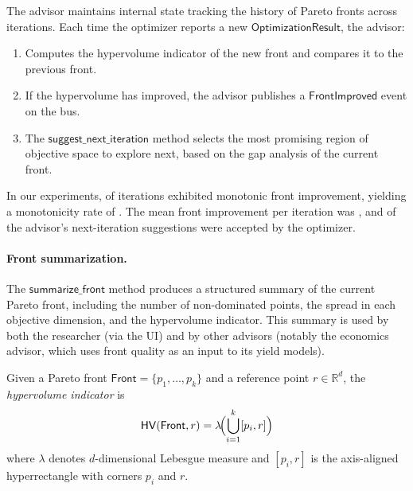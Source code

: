 \documentclass[11pt]{article}
\newcommand{\Front}{\mathsf{Front}}
\begin{document}
The advisor maintains internal state tracking the history of
Pareto fronts across iterations.  Each time the optimizer reports
a new $\mathsf{OptimizationResult}$, the advisor:

\begin{enumerate}
  \item Computes the hypervolume indicator of the new front and
        compares it to the previous front.
  \item If the hypervolume has improved, the advisor publishes a
        $\mathsf{FrontImproved}$ event on the bus.
  \item The $\mathsf{suggest\_next\_iteration}$ method selects
        the most promising region of objective space to explore
        next, based on the gap analysis of the current front.
\end{enumerate}

In our experiments, \ppXCIoptMonotonicRuns{} of
\ppXCIoptIterations{} iterations exhibited monotonic front
improvement, yielding a monotonicity rate of
\ppXCIoptMonotonicity{}.  The mean front improvement per
iteration was \ppXCImeanFrontImprovement{}, and
\ppXCIoptNextAccepted{} of the advisor's next-iteration
suggestions were accepted by the optimizer.

\paragraph{Front summarization.}
The $\mathsf{summarize\_front}$ method produces a structured
summary of the current Pareto front, including the number of
non-dominated points, the spread in each objective dimension,
and the hypervolume indicator.  This summary is used by both
the researcher (via the UI) and by other advisors (notably the
economics advisor, which uses front quality as an input to its
yield models).

\begin{definition}\label{def:hypervolume}
Given a Pareto front $\Front = \{p_1, \ldots, p_k\}$ and a
reference point $r \in \mathbb{R}^d$, the \emph{hypervolume
indicator} is
\[
  \mathsf{HV}(\Front, r) =
  \lambda\!\Bigl(\bigcup_{i=1}^{k} [p_i, r]\Bigr)
\]
where $\lambda$ denotes $d$-dimensional Lebesgue measure and
$[p_i, r]$ is the axis-aligned hyperrectangle with corners
$p_i$ and $r$.
\end{definition}
\end{document}
